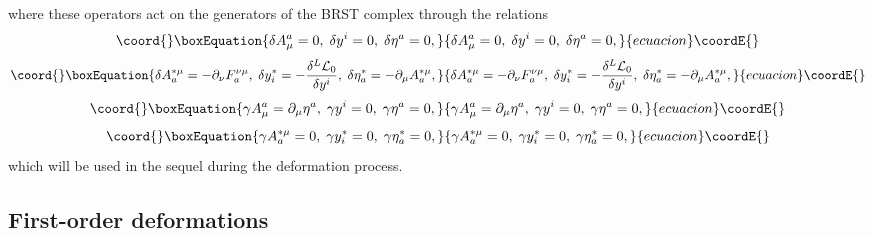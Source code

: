 \documentclass[a4paper,12pt]{article}
\begin{document}
where these operators act on the generators of
the BRST complex through the
relations 
\begin{equation}\coord{}\boxEquation{
\delta A_{\mu }^{a}=0,\;\delta y^{i}=
0,\;\delta \eta ^{a}=0,  \label{4.5}
}{
\delta A_{\mu }^{a}=0,\;\delta y^{i}=
0,\;\delta \eta ^{a}=0,  }{ecuacion}\coordE{}\end{equation}
\begin{equation}\coord{}\boxEquation{
\delta A_{a}^{*\mu }=
-\partial _{\nu }F_{a}^{\nu \mu },\;\delta y_{i}^{*}=-
\frac{\delta ^{L}{\mathcal{L}}_{0}}{\delta y^{i}},
\;\delta \eta _{a}^{*}=
-\partial _{\mu }A_{a}^{*\mu },  \label{4.6}
}{
\delta A_{a}^{*\mu }=
-\partial _{\nu }F_{a}^{\nu \mu },\;\delta y_{i}^{*}=-
\frac{\delta ^{L}{\mathcal{L}}_{0}}{\delta y^{i}},
\;\delta \eta _{a}^{*}=
-\partial _{\mu }A_{a}^{*\mu },  }{ecuacion}\coordE{}\end{equation}
\begin{equation}\coord{}\boxEquation{
\gamma A_{\mu }^{a}=
\partial _{\mu }\eta ^{a},\;\gamma y^{i}=0,\;\gamma \eta
^{a}=0,  \label{4.7}
}{
\gamma A_{\mu }^{a}=
\partial _{\mu }\eta ^{a},\;\gamma y^{i}=0,\;\gamma \eta
^{a}=0,  }{ecuacion}\coordE{}\end{equation}
\begin{equation}\coord{}\boxEquation{
\gamma A_{a}^{*\mu }=0,\;\gamma y_{i}^{*}=
0,\;\gamma \eta _{a}^{*}=0,
\label{4.8}
}{
\gamma A_{a}^{*\mu }=0,\;\gamma y_{i}^{*}=
0,\;\gamma \eta _{a}^{*}=0,
}{ecuacion}\coordE{}\end{equation}
which will be used in the sequel during
the deformation process.

\subsection{First-order deformations}
\end{document}
